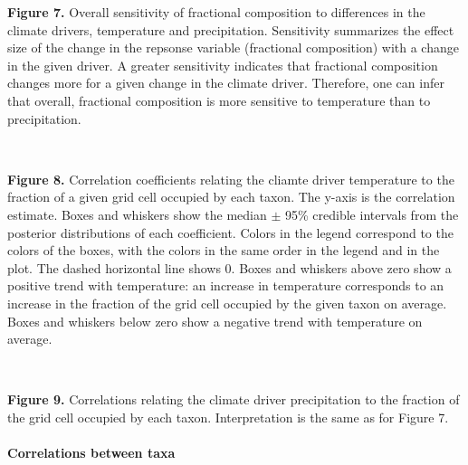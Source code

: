 \documentclass[11pt]{article}
\begin{document}
    \textbf{Figure 7.} Overall sensitivity of fractional composition to
differences in the climate drivers, temperature and precipitation.
Sensitivity summarizes the effect size of the change in the repsonse
variable (fractional composition) with a change in the given driver. A
greater sensitivity indicates that fractional composition changes more
for a given change in the climate driver. Therefore, one can infer that
overall, fractional composition is more sensitive to temperature than to
precipitation.
 
            
    
    \begin{center}
    \end{center}
    { \hspace*{\fill} \\}
    

    \textbf{Figure 8.} Correlation coefficients relating the cliamte driver
temperature to the fraction of a given grid cell occupied by each taxon.
The y-axis is the correlation estimate. Boxes and whiskers show the
median \(\pm\) 95\% credible intervals from the posterior distributions
of each coefficient. Colors in the legend correspond to the colors of
the boxes, with the colors in the same order in the legend and in the
plot. The dashed horizontal line shows 0. Boxes and whiskers above zero
show a positive trend with temperature: an increase in temperature
corresponds to an increase in the fraction of the grid cell occupied by
the given taxon on average. Boxes and whiskers below zero show a
negative trend with temperature on average.
 
            
    
    \begin{center}
    \end{center}
    { \hspace*{\fill} \\}
    

    \textbf{Figure 9.} Correlations relating the climate driver
precipitation to the fraction of the grid cell occupied by each taxon.
Interpretation is the same as for Figure 7.

    \hypertarget{correlations-between-taxa}{%
\paragraph{Correlations between taxa}\label{correlations-between-taxa}}
\end{document}
